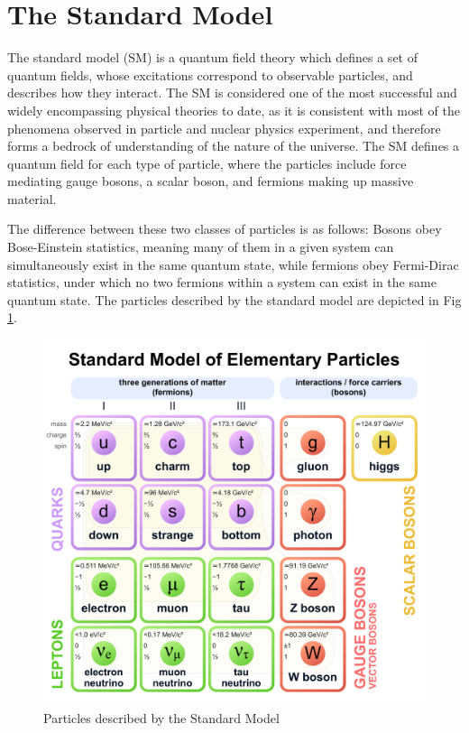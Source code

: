 \section{The Standard Model} \label{sec:SM}

The standard model (SM) is a quantum field theory which defines a set of quantum fields, whose excitations correspond to observable particles, and describes how they interact. The SM is considered one of the most successful and widely encompassing physical theories to date, as it is consistent with most of the phenomena observed in particle and nuclear physics experiment, and therefore forms a bedrock of understanding of the nature of the universe. The SM defines a quantum field for each type of particle, where the particles include force mediating gauge bosons, a scalar boson, and fermions making up massive material. 

The difference between these two classes of particles is as follows: Bosons obey Bose-Einstein statistics, meaning many of them in a given system can simultaneously exist in the same quantum state, while fermions obey Fermi-Dirac statistics, under which no two fermions within a system can exist in the same quantum state. The particles described by the standard model are depicted in Fig \ref{fig:SM_Diagram}.  

\begin{figure}[H]
    \centering
    \includegraphics[width=\textwidth]{Images/Theory/Standard_Model_of_Elementary_Particles.pdf}
    \caption{Particles described by the Standard Model}
    \label{fig:SM_Diagram}
\end{figure}

